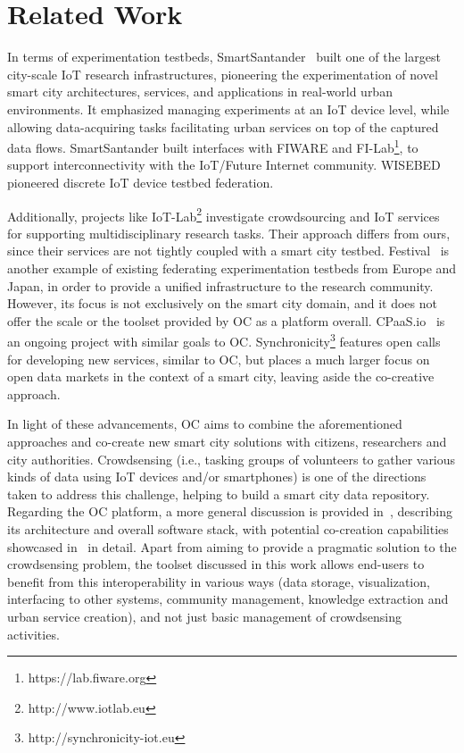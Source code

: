 
\section{Related Work}
\label{sec:sota}

In terms of experimentation testbeds, SmartSantander~\cite{sanchez2014smartsantander} built one of the largest city-scale IoT research infrastructures, pioneering the experimentation of novel smart city architectures, services, and applications in real-world urban environments. It emphasized managing experiments at an IoT device level, while allowing data-acquiring tasks facilitating urban services on top of the captured data flows. SmartSantander built interfaces with FIWARE and FI-Lab\footnote{https://lab.fiware.org}, to support interconnectivity with the IoT/Future Internet community. WISEBED~\cite{Coulson2012} pioneered discrete IoT device testbed federation. 

Additionally, projects like IoT-Lab\footnote{http://www.iotlab.eu} investigate crowdsourcing and IoT services for supporting multidisciplinary research tasks. Their approach differs from ours, since their services are not tightly coupled with a smart city testbed. Festival~\cite{Akiyama2017} is another example of existing federating experimentation testbeds from Europe and Japan, in order to provide a unified infrastructure to the research community. However, its focus is not exclusively on the smart city domain, and it does not offer the scale or the toolset provided by OC as a platform overall. CPaaS.io~\cite{FogFlow} is an ongoing project with similar goals to OC. Synchronicity\footnote{http://synchronicity-iot.eu} features open calls for developing new services, similar to OC, but places a much larger focus on open data markets in the context of a smart city, leaving aside the co-creative approach.

In light of these advancements, OC aims to combine the aforementioned approaches and co-create new smart city solutions with citizens, researchers and city authorities. Crowdsensing (i.e., tasking groups of volunteers to gather various kinds of data using IoT devices and/or smartphones) is one of the directions taken to address this challenge, helping to build a smart city data repository. Regarding the OC platform, a more general discussion is provided in~\cite{gutierrez1}, describing its architecture and overall software stack, with potential co-creation capabilities showcased in~\cite{gutierrez2} in detail. Apart from aiming to provide a pragmatic solution to the crowdsensing problem, the toolset discussed in this work allows end-users to benefit from this interoperability in various ways (data storage, visualization, interfacing to other systems, community management, knowledge extraction and urban service creation), and not just basic management of crowdsensing activities.

